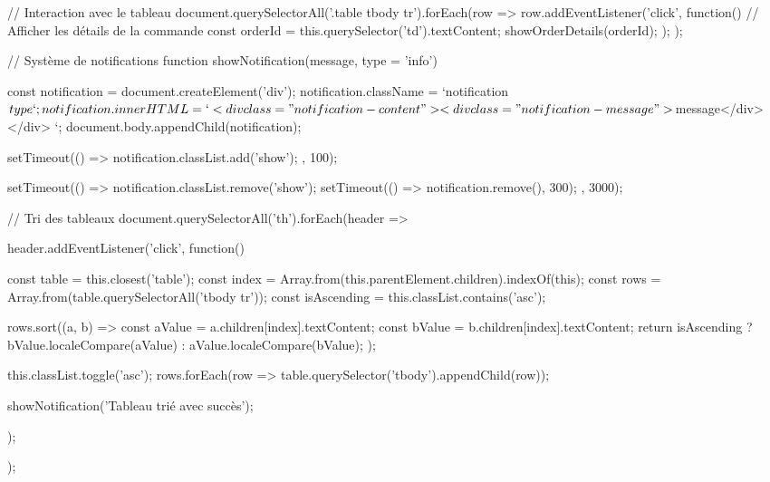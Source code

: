 // Interaction avec le tableau
    document.querySelectorAll('.table tbody tr').forEach(row => {
        row.addEventListener('click', function() {
            // Afficher les détails de la commande
            const orderId = this.querySelector('td').textContent;
            showOrderDetails(orderId);
        });
    });

    // Système de notifications
    function showNotification(message, type = 'info') {
        const notification = document.createElement('div');
        notification.className = `notification ${type}`;
        notification.innerHTML = `
            <div class="notification-content">
                <div class="notification-message">${message}</div>
            </div>
        `;
        document.body.appendChild(notification);
        
        setTimeout(() => {
            notification.classList.add('show');
        }, 100);
        
        setTimeout(() => {
            notification.classList.remove('show');
            setTimeout(() => notification.remove(), 300);
        }, 3000);
    }

    // Tri des tableaux
    document.querySelectorAll('th').forEach(header => {
        header.addEventListener('click', function() {
            const table = this.closest('table');
            const index = Array.from(this.parentElement.children).indexOf(this);
            const rows = Array.from(table.querySelectorAll('tbody tr'));
            const isAscending = this.classList.contains('asc');
            
            rows.sort((a, b) => {
                const aValue = a.children[index].textContent;
                const bValue = b.children[index].textContent;
                return isAscending ? 
                    bValue.localeCompare(aValue) : 
                    aValue.localeCompare(bValue);
            });
            
            this.classList.toggle('asc');
            rows.forEach(row => table.querySelector('tbody').appendChild(row));
            
            showNotification('Tableau trié avec succès');
        });
    });

